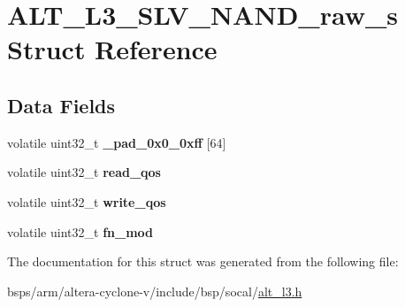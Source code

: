 \hypertarget{structALT__L3__SLV__NAND__raw__s}{}\section{A\+L\+T\+\_\+\+L3\+\_\+\+S\+L\+V\+\_\+\+N\+A\+N\+D\+\_\+raw\+\_\+s Struct Reference}
\label{structALT__L3__SLV__NAND__raw__s}
\subsection*{Data Fields}
\begin{DoxyCompactItemize}
\item 
\mbox{\label{structALT__L3__SLV__NAND__raw__s_aa7abb6b03362de03e1f7e7f926d44ca6}} 
volatile uint32\+\_\+t {\bfseries \+\_\+pad\+\_\+0x0\+\_\+0xff} \mbox{[}64\mbox{]}
\item 
\mbox{\label{structALT__L3__SLV__NAND__raw__s_a8c47cb457024a2c2dc1f6e7bc79db64e}} 
volatile uint32\+\_\+t {\bfseries read\+\_\+qos}
\item 
\mbox{\label{structALT__L3__SLV__NAND__raw__s_a09ddae8d39d05b9e53f6b0227e4dcd36}} 
volatile uint32\+\_\+t {\bfseries write\+\_\+qos}
\item 
\mbox{\label{structALT__L3__SLV__NAND__raw__s_a61c101e44dc92edc0cdd4e728d485d60}} 
volatile uint32\+\_\+t {\bfseries fn\+\_\+mod}
\end{DoxyCompactItemize}


The documentation for this struct was generated from the following file\+:\begin{DoxyCompactItemize}
\item 
bsps/arm/altera-\/cyclone-\/v/include/bsp/socal/\mbox{\hyperlink{alt__l3_8h}{alt\+\_\+l3.\+h}}\end{DoxyCompactItemize}
